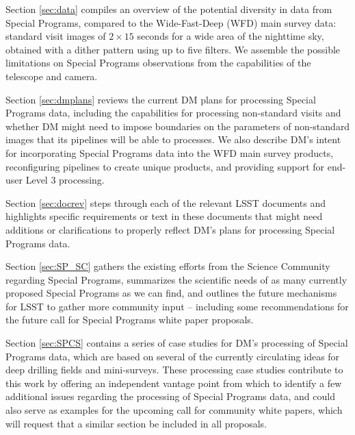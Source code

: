 \documentclass[DM,lsstdraft,toc]{lsstdoc}
\begin{document}
Section \ref{sec:data} compiles an overview of the potential diversity in data from Special Programs, compared to the Wide-Fast-Deep (WFD) main survey data: standard visit images of $2\times15$ seconds for a wide area of the nighttime sky, obtained with a dither pattern using up to five filters. We assemble the possible limitations on Special Programs observations from the capabilities of the telescope and camera.

Section \ref{sec:dmplans} reviews the current DM plans for processing Special Programs data, including the capabilities for processing non-standard visits and whether DM might need to impose boundaries on the parameters of non-standard images that its pipelines will be able to processes. We also describe DM's intent for incorporating Special Programs data into the WFD main survey products, reconfiguring pipelines to create unique products, and providing support for end-user Level 3 processing. 

Section \ref{sec:docrev} steps through each of the relevant LSST documents and highlights specific requirements or text in these documents that might need additions or clarifications to properly reflect DM's plans for processing Special Programs data.

Section \ref{sec:SP_SC} gathers the existing efforts from the Science Community regarding Special Programs, summarizes the scientific needs of as many currently proposed Special Programs as we can find, and outlines the future mechanisms for LSST to gather more community input -- including some recommendations for the future call for Special Programs white paper proposals.

Section \ref{sec:SPCS} contains a series of case studies for DM's processing of Special Programs data, which are based on several of the currently circulating ideas for deep drilling fields and mini-surveys. These processing case studies contribute to this work by offering an independent vantage point from which to identify a few additional issues regarding the processing of Special Programs data, and could also serve as examples for the upcoming call for community white papers, which will request that a similar section be included in all proposals.
\end{document}
